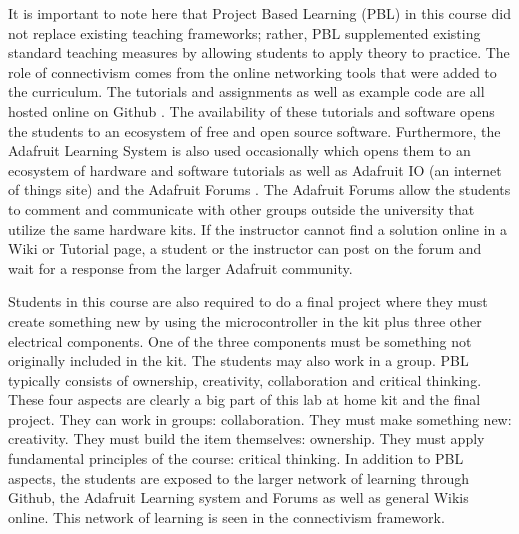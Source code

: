 It is important to note here that Project Based Learning (PBL) in this
course did not replace existing teaching frameworks; rather, PBL
supplemented existing standard teaching measures by allowing students
to apply theory to practice. The role of connectivism comes from the
online networking tools that were added to the curriculum. The
tutorials and assignments as well as example code are all hosted
online on Github \cite{Github}. The availability of these
tutorials and software opens the students to an ecosystem of free and
open source software. Furthermore, the Adafruit Learning System is
also used occasionally which opens them to an ecosystem of hardware
and software tutorials as well as Adafruit IO (an internet of things
site) and the Adafruit Forums \cite{Adafruit}. The Adafruit Forums
allow the students to comment and communicate with other groups
outside the university that utilize the same hardware kits. If the
instructor cannot find a solution online in a Wiki or Tutorial page, a
student or the instructor can post on the forum and wait for a
response from the larger Adafruit community. 

Students in this course are also required to do a final project
where they must create something new by using the microcontroller in
the kit plus three other electrical components. One of the three
components must be something not originally included in the kit. The
students may also work in a group. PBL typically consists of
ownership, creativity, collaboration and critical thinking. These four
aspects are clearly a big part of this lab at home kit and the final
project. They can work in groups: collaboration. They must make
something new: creativity. They must build the item themselves:
ownership. They must apply fundamental principles of the course:
critical thinking. In addition to PBL aspects, the students are
exposed to the larger network of learning through Github, the Adafruit
Learning system and Forums as well as general Wikis online. This
network of learning is seen in the connectivism framework.



